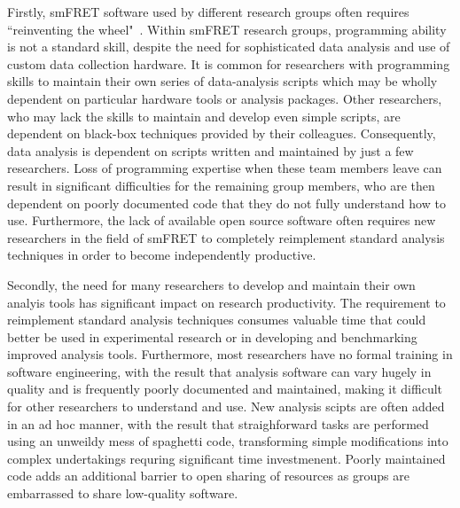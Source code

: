 

Firstly, smFRET software used by different research groups often requires ``reinventing the wheel"~\cite{mirams13}. Within smFRET research groups, programming ability is not a standard skill, despite the need for sophisticated data analysis and use of custom data collection hardware. It is common for researchers with programming skills to maintain their own series of data-analysis scripts which may be wholly dependent on particular hardware tools or analysis packages. Other researchers, who may lack the skills to maintain and develop even simple scripts, are dependent on black-box techniques provided by their colleagues. Consequently, data analysis is dependent on scripts written and maintained by just a few researchers. Loss of programming expertise when these team members leave can result in significant difficulties for the remaining group members, who are then dependent on poorly documented code that they do not fully understand how to use. Furthermore, the lack of available open source software often requires new researchers in the field of smFRET to completely reimplement standard analysis techniques in order to become independently productive.    

Secondly, the need for many researchers to develop and maintain their own analyis tools has significant impact on research productivity. The requirement to reimplement standard analysis techniques consumes valuable time that could better be used in experimental research or in developing and benchmarking improved analysis tools. Furthermore, most researchers have no formal training in software engineering, with the result that analysis software can vary hugely in quality and is frequently poorly documented and maintained, making it difficult for other researchers to understand and use. New analysis scipts are often added in an ad hoc manner, with the result that straighforward tasks are performed using an unweildy mess of spaghetti code, transforming simple modifications into complex undertakings requring significant time investmenent. Poorly maintained code adds an additional barrier to open sharing of resources as groups are embarrassed to share low-quality software.  

